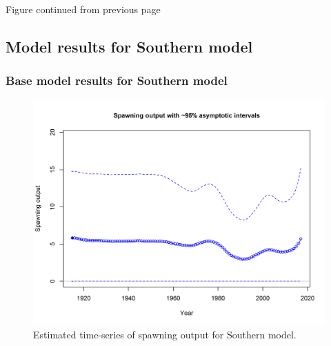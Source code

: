 \documentclass[12pt,]{article}
\begin{document}
\begin{center} 

            Figure continued from previous page 

            \end{center}

\FloatBarrier

\newpage

\subsection{Model results for Southern
model}\label{model-results-for-southern-model}

\subsubsection{Base model results for Southern
model}\label{base-model-results-for-southern-model}

\begin{figure}[htbp]
\centering
\includegraphics{r4ss/plots_mod2/ts7_Spawning_output_with_95_asymptotic_intervals_intervals.png}
\caption{Estimated time-series of spawning output for Southern model.
\label{fig:ssb.S}}
\end{figure}

\FloatBarrier
\end{document}
